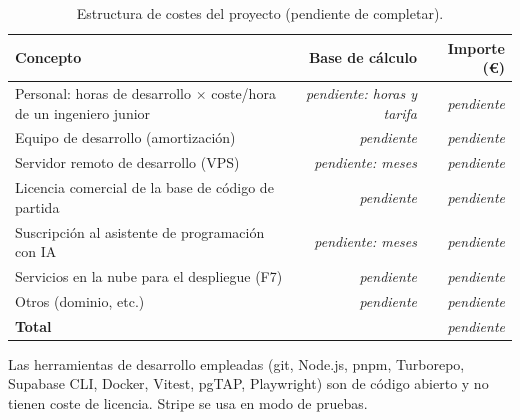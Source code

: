 

\begin{table}[htbp]
  \centering
  \small
  \caption{Estructura de costes del proyecto (pendiente de completar).}
  \label{tab:costes}
  \begin{tabularx}{\textwidth}{@{}Xrr@{}}
    \toprule
    \textbf{Concepto} & \textbf{Base de cálculo} & \textbf{Importe (€)} \\
    \midrule
    Personal: horas de desarrollo $\times$ coste/hora de un ingeniero junior & \textit{pendiente: horas y tarifa} & \textit{pendiente} \\
    Equipo de desarrollo (amortización) & \textit{pendiente} & \textit{pendiente} \\
    Servidor remoto de desarrollo (VPS) & \textit{pendiente: meses} & \textit{pendiente} \\
    Licencia comercial de la base de código de partida %
      & \textit{pendiente} & \textit{pendiente} \\
    Suscripción al asistente de programación con IA & \textit{pendiente: meses} & \textit{pendiente} \\
    Servicios en la nube para el despliegue (F7) & \textit{pendiente} & \textit{pendiente} \\
    Otros (dominio, etc.) & \textit{pendiente} & \textit{pendiente} \\
    \midrule
    \textbf{Total} & & \textit{pendiente} \\
    \bottomrule
  \end{tabularx}
\end{table}

Las herramientas de desarrollo empleadas (git, Node.js, pnpm, Turborepo,
Supabase CLI, Docker, Vitest, pgTAP, Playwright) son de código abierto y no
tienen coste de licencia. Stripe se usa en modo de pruebas.
